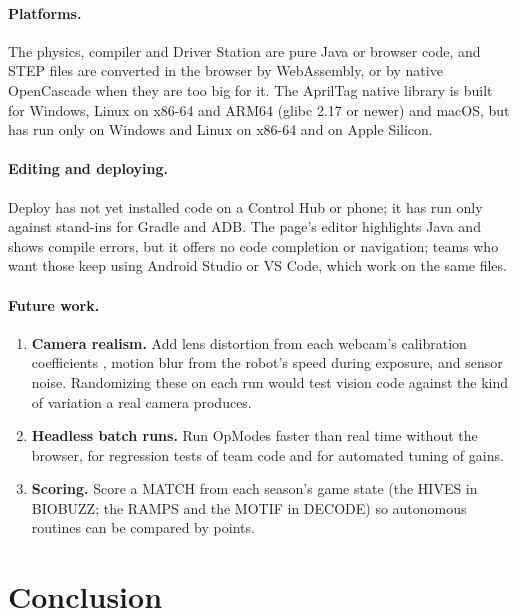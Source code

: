 \documentclass[10pt,twocolumn,letterpaper]{article}
\begin{document}
\paragraph{Platforms.} The physics, compiler and Driver Station are pure Java or browser code, and STEP files are converted in the browser by WebAssembly, or by native OpenCascade when they are too big for it. The AprilTag native library is built for Windows, Linux on x86-64 and ARM64 (glibc 2.17 or newer) and macOS, but has run only on Windows and Linux on x86-64 and on Apple Silicon.

\paragraph{Editing and deploying.} Deploy has not yet installed code on a Control Hub or phone; it has run only against stand-ins for Gradle and ADB. The page's editor highlights Java and shows compile errors, but it offers no code completion or navigation; teams who want those keep using Android Studio or VS Code, which work on the same files.

\paragraph{Future work.}\mbox{}

\begin{enumerate}
\item \textbf{Camera realism.} Add lens distortion from each webcam's calibration coefficients \citep{zhang2000flexible}, motion blur from the robot's speed during exposure, and sensor noise. Randomizing these on each run \citep{tobin2017domain} would test vision code against the kind of variation a real camera produces.
\item \textbf{Headless batch runs.} Run OpModes faster than real time without the browser, for regression tests of team code and for automated tuning of gains.
\item \textbf{Scoring.} Score a MATCH from each season's game state (the HIVES in BIOBUZZ; the RAMPS and the MOTIF in DECODE) so autonomous routines can be compared by points.
\end{enumerate}

\section{Conclusion}\label{sec:conclusion}
\end{document}
